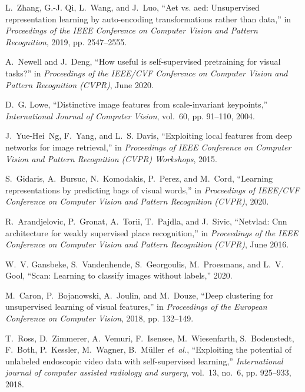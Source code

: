 \documentclass[journal,twoside,web]{ieeecolor}
\begin{document}
\begin{thebibliography}{10}
L.~Zhang, G.-J. Qi, L.~Wang, and J.~Luo, ``Aet vs. aed: Unsupervised
  representation learning by auto-encoding transformations rather than data,''
  in \emph{Proceedings of the IEEE Conference on Computer Vision and Pattern
  Recognition}, 2019, pp. 2547--2555.

A.~Newell and J.~Deng, ``How useful is self-supervised pretraining for visual
  tasks?'' in \emph{Proceedings of the IEEE/CVF Conference on Computer Vision
  and Pattern Recognition (CVPR)}, June 2020.

D.~G. Lowe, ``Distinctive image features from scale-invariant keypoints,''
  \emph{International Journal of Computer Vision}, vol.~60, pp. 91--110, 2004.

J.~Yue-Hei~Ng, F.~Yang, and L.~S. Davis, ``Exploiting local features from deep
  networks for image retrieval,'' in \emph{Proceedings of IEEE Conference on
  Computer Vision and Pattern Recognition (CVPR) Workshops}, 2015.

S.~Gidaris, A.~Bursuc, N.~Komodakis, P.~Perez, and M.~Cord, ``Learning
  representations by predicting bags of visual words,'' in \emph{Proceedings of
  IEEE/CVF Conference on Computer Vision and Pattern Recognition (CVPR)}, 2020.

R.~Arandjelovic, P.~Gronat, A.~Torii, T.~Pajdla, and J.~Sivic, ``Netvlad: Cnn
  architecture for weakly supervised place recognition,'' in \emph{Proceedings
  of the IEEE Conference on Computer Vision and Pattern Recognition (CVPR)},
  June 2016.

W.~V. Gansbeke, S.~Vandenhende, S.~Georgoulis, M.~Proesmans, and L.~V. Gool,
  ``Scan: Learning to classify images without labels,'' 2020.

M.~Caron, P.~Bojanowski, A.~Joulin, and M.~Douze, ``Deep clustering for
  unsupervised learning of visual features,'' in \emph{Proceedings of the
  European Conference on Computer Vision}, 2018, pp. 132--149.

T.~Ross, D.~Zimmerer, A.~Vemuri, F.~Isensee, M.~Wiesenfarth, S.~Bodenstedt,
  F.~Both, P.~Kessler, M.~Wagner, B.~M{\"u}ller \emph{et~al.}, ``Exploiting the
  potential of unlabeled endoscopic video data with self-supervised learning,''
  \emph{International journal of computer assisted radiology and surgery},
  vol.~13, no.~6, pp. 925--933, 2018.


\end{thebibliography}
\end{document}
